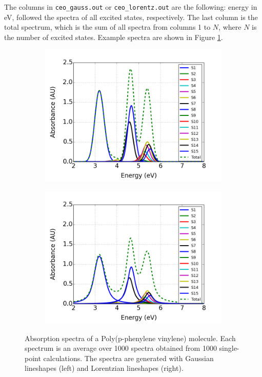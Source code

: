\documentclass[letterpaper,12pt,titlepage]{article}
\begin{document}
The columns in \verb+ceo_gauss.out+ or \verb+ceo_lorentz.out+ are the following: energy in eV, followed the spectra of all excited states, respectively.  The last column is the total spectrum, which is the sum of all spectra from columns 1 to $N$, where $N$ is the number of excited states.  Example spectra are shown in Figure \ref{example_spectra}.
\begin{figure}[h]
        \centering
        \begin{subfigure}[h]{0.475\textwidth}
            \centering
            \includegraphics[scale=.4]{spec_gauss.png}
        \end{subfigure}
	\hspace{3mm}
        \begin{subfigure}[h]{0.475\textwidth}  
            \centering 
            \includegraphics[scale=.4]{spec_lorentz.png}
        \end{subfigure}
	\caption{\small Absorption spectra of a Poly(p-phenylene vinylene) molecule.  Each spectrum is an average over 1000 spectra obtained from 1000 single-point calculations.  The spectra are generated with Gaussian lineshapes (left) and Lorentzian lineshapes (right).}
\label{example_spectra}
\end{figure}
\end{document}
